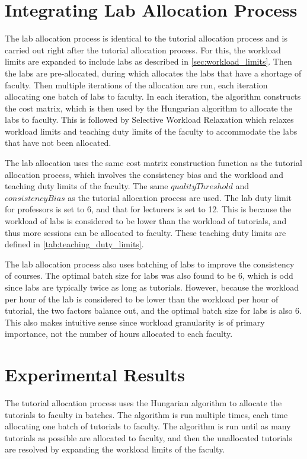 \section{Integrating Lab Allocation Process}

The lab allocation process is identical to the tutorial allocation process and is carried out right after the tutorial allocation process. For this, the workload limits are expanded to include labs as described in \autoref{sec:workload_limits}. Then the labs are pre-allocated, during which allocates the labs that have a shortage of faculty. Then multiple iterations of the allocation are run, each iteration allocating one batch of labs to faculty. In each iteration, the algorithm constructs the cost matrix, which is then used by the Hungarian algorithm to allocate the labs to faculty. This is followed by Selective Workload Relaxation which relaxes workload limits and teaching duty limits of the faculty to accommodate the labs that have not been allocated.

The lab allocation uses the same cost matrix construction function as the tutorial allocation process, which involves the consistency bias and the workload and teaching duty limits of the faculty. The same $qualityThreshold$ and $consistencyBias$ as the tutorial allocation process are used. The lab duty limit for professors is set to 6, and that for lecturers is set to 12. This is because the workload of labs is considered to be lower than the workload of tutorials, and thus more sessions can be allocated to faculty. These teaching duty limits are defined in \autoref{tab:teaching_duty_limits}.

The lab allocation process also uses batching of labs to improve the consistency of courses. The optimal batch size for labs was also found to be 6, which is odd since labs are typically twice as long as tutorials. However, because the workload per hour of the lab is considered to be lower than the workload per hour of tutorial, the two factors balance out, and the optimal batch size for labs is also 6. This also makes intuitive sense since workload granularity is of primary importance, not the number of hours allocated to each faculty.


\section{Experimental Results}

The tutorial allocation process uses the Hungarian algorithm to allocate the tutorials to faculty in batches. The algorithm is run multiple times, each time allocating one batch of tutorials to faculty. The algorithm is run until as many tutorials as possible are allocated to faculty, and then the unallocated tutorials are resolved by expanding the workload limits of the faculty.

